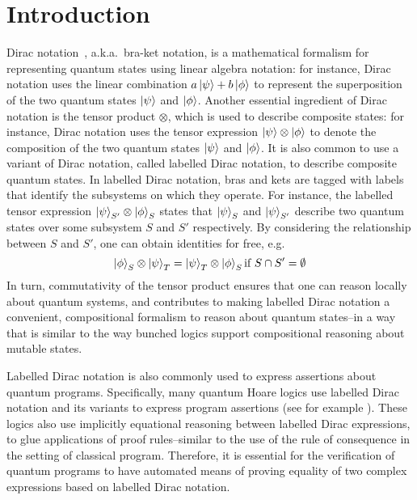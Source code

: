 
\section{Introduction}


Dirac notation~\cite{dirac1939new}, a.k.a.\, bra-ket notation, is a
mathematical formalism for representing quantum states using linear
algebra notation: for instance, Dirac notation uses the linear
combination \( a\ket{\psi} + b\ket{\phi} \) to represent the
superposition of the two quantum states \( \ket{\psi} \) and
\( \ket{\phi} \). Another essential ingredient of Dirac notation
is the tensor product $\otimes$, which is used to describe composite
states: for instance, Dirac notation uses the tensor expression
\( \ket{\psi} \otimes \ket{\phi} \) to denote the composition of
the two quantum states \( \ket{\psi} \) and \( \ket{\phi} \). It is
also common to use a variant of Dirac notation, called labelled Dirac
notation, to describe composite quantum states. In labelled Dirac
notation, bras and kets are tagged with labels that identify the
subsystems on which they operate. For instance, the labelled tensor
expression
\( \ket{\psi}_{S'} \otimes \ket{\phi}_{S} \)
states that $\ket{\psi}_S$ and $\ket{\psi}_{S'}$ describe two quantum
states over some subsystem $S$ and $S'$ respectively. By considering
the relationship between $S$ and $S'$, one can obtain identities for
free, e.g.\, 
%
$$\ket{\phi}_S \otimes \ket{\psi}_{T} = \ket{\psi}_{T} \otimes \ket{\phi}_S
\mbox{if}~S\cap S'=\emptyset$$
%
In turn, commutativity of the tensor product ensures that one can
reason locally about quantum systems, and contributes to making
labelled Dirac notation a convenient, compositional formalism to
reason about quantum states--in a way that is similar to the way
bunched logics support compositional reasoning about mutable states.

Labelled Dirac notation is also commonly used to express assertions
about quantum programs. Specifically, many quantum Hoare logics use
labelled Dirac notation and its variants to express program assertions (see for example \cite{DBLP:conf/lics/ZhouBHYY21} \cite{Zhou2023} \cite{qRHL_unruh2019} \cite{QSL_Le_2022} \cite{Zhong2024-np} \cite{incorrectness_2022} \cite{qafny2024}). 
These logics also use
implicitly equational reasoning between labelled Dirac expressions, to
glue applications of proof rules--similar to the use of the rule of
consequence in the setting of classical program. Therefore, it is
essential for the verification of quantum programs to have automated
means of proving equality of two complex expressions based on labelled
Dirac notation.


